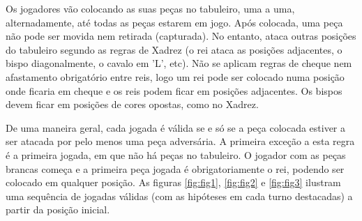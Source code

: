 \documentclass[a4paper]{article}
\begin{document}
Os jogadores vão colocando as suas peças no tabuleiro, uma a uma, alternadamente, até todas as peças estarem em jogo.
Após colocada, uma peça não pode ser movida nem retirada (capturada).
No entanto, ataca outras posições do tabuleiro segundo as regras de Xadrez (o rei ataca as posições adjacentes, o bispo diagonalmente, o cavalo em 'L', etc).
Não se aplicam regras de cheque nem afastamento obrigatório entre reis, logo um rei pode ser colocado numa posição onde ficaria em cheque e os reis podem ficar em posições adjacentes. Os bispos devem ficar em posições de cores opostas, como no Xadrez.\linebreak

De uma maneira geral, cada jogada é válida se e só se a peça colocada estiver a ser atacada por pelo menos uma peça adversária. A primeira exceção a esta regra é a primeira jogada, em que não há peças no tabuleiro. O jogador com as peças brancas começa e a primeira peça jogada é obrigatoriamente o rei, podendo ser colocado em qualquer posição.
As figuras \ref{fig:fig1}, \ref{fig:fig2} e \ref{fig:fig3} ilustram uma sequência de jogadas válidas (com as hipóteses em cada turno destacadas) a partir da posição inicial.
\end{document}
